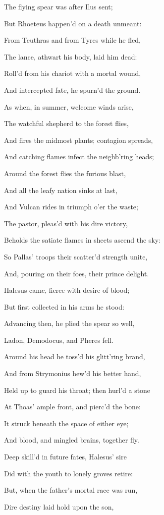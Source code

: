 The flying spear was after Ilus sent;

But Rhoeteus happen’d on a death unmeant:

From Teuthras and from Tyres while he fled,

The lance, athwart his body, laid him dead:

Roll’d from his chariot with a mortal wound,

And intercepted fate, he spurn’d the ground.

As when, in summer, welcome winds arise,

The watchful shepherd to the forest flies,

And fires the midmost plants; contagion spreads,

And catching flames infect the neighb’ring heads;

Around the forest flies the furious blast,

And all the leafy nation sinks at last,

And Vulcan rides in triumph o’er the waste;

The pastor, pleas’d with his dire victory,

Beholds the satiate flames in sheets ascend the sky:

So Pallas’ troops their scatter’d strength unite,

And, pouring on their foes, their prince delight.

Halesus came, fierce with desire of blood;

But first collected in his arms he stood:

Advancing then, he plied the spear so well,

Ladon, Demodocus, and Pheres fell.

Around his head he toss’d his glitt’ring brand,

And from Strymonius hew’d his better hand,

Held up to guard his throat; then hurl’d a stone

At Thoas’ ample front, and pierc’d the bone:

It struck beneath the space of either eye;

And blood, and mingled brains, together fly.

Deep skill’d in future fates, Halesus’ sire

Did with the youth to lonely groves retire:

But, when the father’s mortal race was run,

Dire destiny laid hold upon the son,

